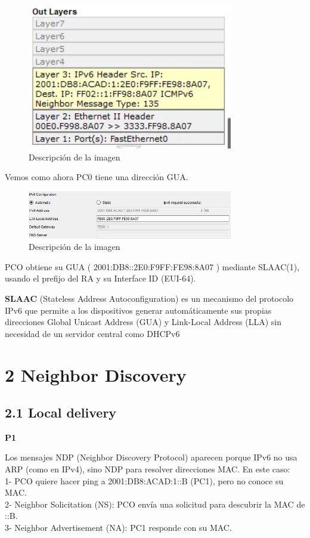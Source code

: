\documentclass{article}
\begin{document}
\begin{figure}[h]
    \centering
    \includegraphics[width=0.8\textwidth]{imagen2.PNG}
    \caption{Descripción de la imagen}
    \label{fig:ejemplo}
\end{figure}

Vemos como ahora PC0 tiene una dirección GUA.
\begin{figure}[h]
    \centering
    \includegraphics[width=0.8\textwidth]{imagen3.PNG}
    \caption{Descripción de la imagen}
    \label{fig:ejemplo}
\end{figure}


PCO obtiene su GUA ( 2001:DB8::2E0:F9FF:FE98:8A07 ) mediante SLAAC(1), usando el prefijo del RA y su Interface ID (EUI-64).

\textbf{SLAAC} (Stateless Address Autoconfiguration) es un mecanismo del protocolo IPv6 que permite a los dispositivos generar automáticamente sus propias direcciones Global Unicast Address (GUA) y Link-Local Address (LLA) sin necesidad de un servidor central como DHCPv6

\section*{2 Neighbor Discovery}
\subsection*{2.1 Local delivery}
\textbf{P1}

Los mensajes NDP (Neighbor Discovery Protocol) aparecen porque IPv6 no usa ARP (como en IPv4), sino NDP para resolver direcciones MAC. En este caso:\\
1- PCO quiere hacer ping a 2001:DB8:ACAD:1::B (PC1), pero no conoce su MAC.\\
2- Neighbor Solicitation (NS): PCO envía una solicitud para descubrir la MAC de ::B.\\
3- Neighbor Advertisement (NA): PC1 responde con su MAC.
\\
\end{document}
